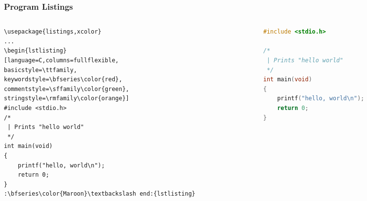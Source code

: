\begin{frame}[fragile]
\frametitle{Program Listings}

\begin{columns}
\begin{column}{.5\textwidth}
\begin{beamerboxesrounded}{}
\vspace{-1em}
\begin{lstlisting}[basicstyle=\ttfamily\footnotesize,
emph={listings,lstlisting},moretexcs={color}]
\usepackage{listings,xcolor}
...
\begin{lstlisting}
[language=C,columns=fullflexible,
basicstyle=\ttfamily,
keywordstyle=\bfseries\color{red},
commentstyle=\sffamily\color{green},
stringstyle=\rmfamily\color{orange}]
#include <stdio.h>
/* 
 | Prints "hello world"
 */
int main(void)
{
    printf("hello, world\n");
    return 0;
}
:\bfseries\color{Maroon}\textbackslash end:{lstlisting}
\end{lstlisting}
\vspace{-1em}
\end{beamerboxesrounded}
\end{column}
\hfill\begin{column}{.46\textwidth}
\begin{lstlisting}[language=C,escapechar=~,lineskip=-2pt,
basicstyle=\ttfamily,
commentstyle=\upshape\sffamily\small\color{SeaGreen4},keepspaces=true,
keywordstyle=\bfseries\color{Maroon},stringstyle=\rmfamily\color{Sienna2}]
#include <stdio.h>

/* 
 | Prints "hello world"
 */
int main(void)
{
    printf("hello, world\n");
    return 0;
}
\end{lstlisting}
\end{column}
\end{columns}
\end{frame}


